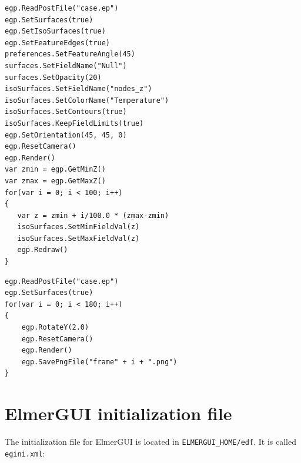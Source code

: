 \documentclass[a4paper,12pt]{article}
\begin{document}
\vskip5mm
\begin{footnotesize}
\begin{verbatim}
egp.ReadPostFile("case.ep")
egp.SetSurfaces(true)
egp.SetIsoSurfaces(true)
egp.SetFeatureEdges(true)
preferences.SetFeatureAngle(45)
surfaces.SetFieldName("Null")
surfaces.SetOpacity(20)
isoSurfaces.SetFieldName("nodes_z")
isoSurfaces.SetColorName("Temperature")
isoSurfaces.SetContours(true)
isoSurfaces.KeepFieldLimits(true)
egp.SetOrientation(45, 45, 0)
egp.ResetCamera()
egp.Render()
var zmin = egp.GetMinZ()
var zmax = egp.GetMaxZ()
for(var i = 0; i < 100; i++)
{
   var z = zmin + i/100.0 * (zmax-zmin)
   isoSurfaces.SetMinFieldVal(z)
   isoSurfaces.SetMaxFieldVal(z)
   egp.Redraw()
}
\end{verbatim}
\end{footnotesize}

\vskip5mm
\begin{footnotesize}
\begin{verbatim}
egp.ReadPostFile("case.ep")
egp.SetSurfaces(true)
for(var i = 0; i < 180; i++)
{
    egp.RotateY(2.0)
    egp.ResetCamera()
    egp.Render()
    egp.SavePngFile("frame" + i + ".png")
}
\end{verbatim}
\end{footnotesize}





\appendix

\section{ElmerGUI initialization file}

The initialization file for ElmerGUI is located in {\tt ELMERGUI\_HOME/edf}. It is called {\tt egini.xml}:
\end{document}
